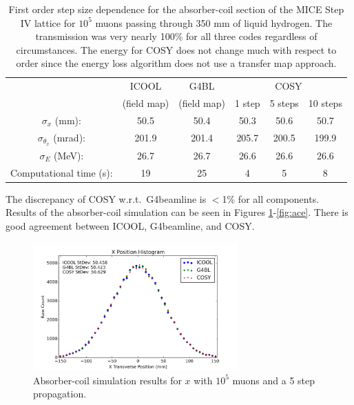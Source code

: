 \begin{table}
\caption[Step size dependence for the absorber-coil section of the MICE Step IV lattice for liquid hydrogen.]{First order step size dependence for the absorber-coil section of the MICE Step IV lattice for $10^5$ muons passing through 350 mm of liquid hydrogen. The transmission was very nearly 100\% for all three codes regardless of circumstances. The energy for COSY does not change much with respect to order since the energy loss algorithm does not use a transfer map approach.}
\begin{center}
\begin{tabularx}{\textwidth}{cccccc}
\hline \hline
& ICOOL & G4BL & \multicolumn{3}{c}{\sout{\hspace{1.5cm}} COSY \sout{\hspace{1.5cm}}}\\
& (field map) & (field map) & 1 step & 5 steps & 10 steps\\
\hline
$\sigma_x$ (mm): & 50.5 & 50.4 & 50.3 & 50.6 & 50.7\\
$\sigma_{\theta_x}$ (mrad): & 201.9 & 201.4 & 205.7 & 200.5 & 199.9\\
$\sigma_E$ (MeV): & 26.7 & 26.7 & 26.6 & 26.6 & 26.6\\
Computational time (s): & 19 & 25 & 4 & 5 & 8\\
\hline
\end{tabularx}
\end{center}
\label{tbl:mice_step_size_ac}
\end{table}

The discrepancy of COSY w.r.t.\ G4beamline is $<$1\% for all components. Results of the absorber-coil simulation can be seen in Figures \ref{fig:acx}-\ref{fig:ace}. There is good agreement between ICOOL, G4beamline, and COSY.

\begin{figure}[H]
  \centering
    \includegraphics[width=0.7\textwidth]{MICE data/absorber coils/x} 
  \caption{Absorber-coil simulation results for $x$ with $10^5$ muons and a 5 step propagation.}
  \label{fig:acx}
\end{figure}

